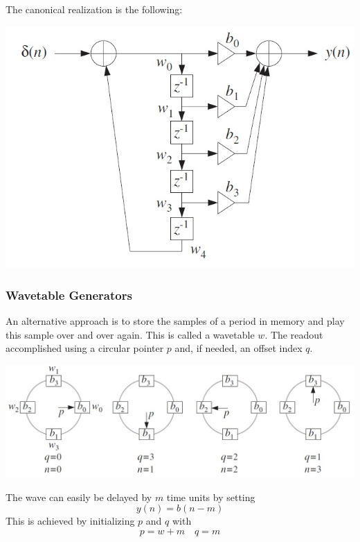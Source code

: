 The canonical realization is the following:
\begin{center}
	\includegraphics[width=\linewidth]{images/SignProcApp_PeriodicWaveFormGen.jpg}
\end{center}


\newpage
\subsubsection{Wavetable Generators}
An alternative approach is to store the samples of a period in memory and
play this sample over and over again. This is called a wavetable $w$. The readout
accomplished using a circular pointer $p$ and, if needed, an offset index $q$.

\begin{center}
	\includegraphics[width=\linewidth]{images/SignProcApp_Wavetable.jpg}
\end{center}

The wave can easily be delayed by $m$ time units by setting
\begin{equation*}
	y(n) = b(n-m)
\end{equation*}
This is achieved by initializing $p$ and $q$ with 
\begin{equation*}
	p = w+m \quad q=m
\end{equation*}

